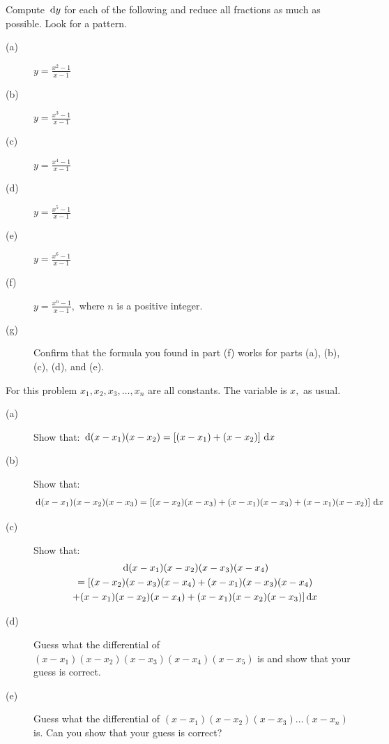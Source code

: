 \begin{ProblemSection}
  \begin{myproblem}{}
    Compute $\thinspace{\rm d}y$ for each of the following and reduce all fractions
    as much as possible. Look for a pattern.
    \begin{multicols}{2}
      \begin{description}
      \item[(a)] $\displaystyle y=\frac{x^2-1}{x-1}$
      \item[(b)] $\displaystyle y=\frac{x^3-1}{x-1}$
      \item[(c)] $\displaystyle y=\frac{x^4-1}{x-1}$
      \item[(d)] $\displaystyle y=\frac{x^5-1}{x-1}$
      \item[(e)] $\displaystyle y=\frac{x^6-1}{x-1}$
      \item[(f)] $\displaystyle y=\frac{x^n-1}{x-1},$ where $n$ is a
        positive integer.
      \item[(g)] Confirm that the formula you found in part (f) works
        for parts (a), (b), (c), (d), and (e).
      \end{description}
    \end{multicols}
  \end{myproblem}

  \begin{myproblem}{}
    For this problem $x_1, x_2, x_3, \ldots, x_n$ are all
    constants. The variable is $x,$ as usual.
    \begin{description}
    \item[(a)] Show that: $\thinspace{\rm d}(x-x_1)(x-x_2) =
      \left[(x-x_1)+(x-x_2)\right]\thinspace{\rm d}x$
    \item[(b)] Show that: 
      \[\thinspace{\rm d}(x-x_1)(x-x_2)(x-x_3) = \left[(x-x_2)(x-x_3) +
        (x-x_1)(x-x_3) + (x-x_1)(x-x_2)\right]\thinspace{\rm d}x\]
    \item[(c)] Show that: 
        \begin{multline*}
          \thinspace{\rm d}(x-x_1)(x-x_2)(x-x_3)(x-x_4)\\ = [(x-x_2)(x-x_3)(x-x_4) +
          (x-x_1)(x-x_3)(x-x_4)\\ + (x-x_1)(x-x_2)(x-x_4) +
          (x-x_1)(x-x_2)(x-x_3)]\thinspace{\rm d}x
        \end{multline*}
      \item[(d)] Guess what the differential of \(
        (x-x_1)(x-x_2)(x-x_3)(x-x_4)(x-x_5) \) is and show that your
        guess is correct.
      \item[(e)] Guess what the differential of \(
        (x-x_1)(x-x_2)(x-x_3)\ldots(x-x_n) \) is. Can you show that
        your guess is correct?
    \end{description}
  \end{myproblem}


\end{ProblemSection}
